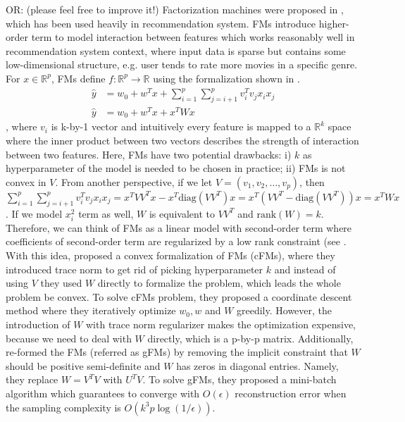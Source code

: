 \documentclass{article}
\newcommand{\diag}{\text{diag}}
\newcommand{\rank}{\text{rank}}
\begin{document}
OR: (please feel free to improve it!)
Factorization machines were proposed in \cite{FM_paper}, which has been used heavily in recommendation system. FMs introduce higher-order term to model interaction between features which works reasonably well in recommendation system context, where input data is sparse but contains some low-dimensional structure, e.g. user tends to rate more movies in a specific genre. For $x \in \mathbb{R}^p$, FMs define $f: \mathbb{R}^p \rightarrow \mathbb{R}$ using the formalization shown in . 
\begin{align}
  \hat{y} &= w_0 + w^T x + \sum_{i = 1}^p\sum_{j = i + 1}^p v_i^T v_j x_i x_j \label{eq:original} \\
  \hat{y} &= w_0 + w^T x + x^T W x \label{eq:reformal}
\end{align}
, where $v_i$ is k-by-1 vector and intuitively every feature is mapped to a $\mathbb{R}^k$ space where the inner product between two vectors describes the strength of interaction between two features. Here, FMs have two potential drawbacks: i) $k$ as hyperparameter of the model is needed to be chosen in practice; ii) FMs is not convex in $V$. From another perspective, if we let $V = (v_1, v_2, …, v_p)$, then $\sum_{i = 1}^p\sum_{j = i + 1}^p v_i^T v_j x_i x_j = x^T V V^T x - x^T \diag(V V^T) x = x^T (V V^T -  \diag(V V^T))  x = x^T W x$. If we model $x_i^2$ term as well, $W$ is equivalent to $VV^T$ and $\rank(W) = k$. Therefore, we can think of FMs as a linear model with second-order term where coefficients of second-order term are regularized by a low rank constraint (see . With this idea, \cite{convexFM_paper} proposed a convex formalization of FMs (cFMs), where they introduced trace norm to get rid of picking hyperparameter $k$ and instead of using $V$ they used $W$ directly to formalize the problem, which leads the whole problem be convex. To solve cFMs problem, they proposed a coordinate descent method where they iteratively optimize $w_0, w$ and $W$ greedily. However, the introduction of $W$ with trace norm regularizer makes the optimization expensive, because we need to deal with $W$ directly, which is a p-by-p matrix. Additionally, \cite{generalizedFM_paper} re-formed the FMs (referred as gFMs) by removing the implicit constraint that $W$ should be positive semi-definite and $W$ has zeros in diagonal entries. Namely, they replace $W = V^TV$ with $U^TV$. To solve gFMs, they proposed a mini-batch algorithm which guarantees to converge with $O(\epsilon)$ reconstruction error when the sampling complexity is $O(k^3p \log(1/\epsilon))$. 
\end{document}
